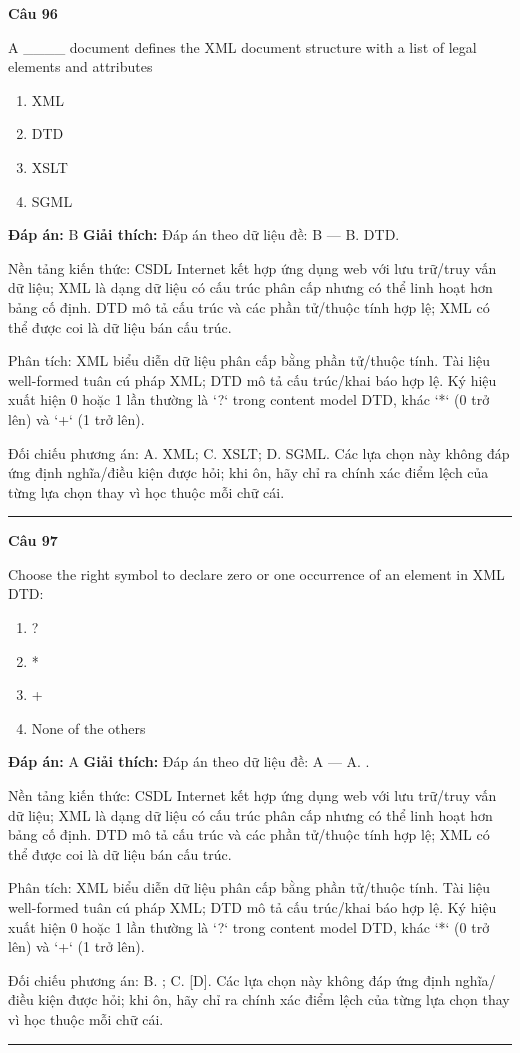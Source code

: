\documentclass[11pt,a4paper]{article}
\newenvironment{question}[1]{%
  \par\vspace{1em}\noindent\textbf{\large Câu #1}\par\vspace{0.4em}
}{%
  \par\vspace{1em}\hrule\vspace{0.6em}
}
\newenvironment{choices}{%
  \begin{enumerate}[label=\textbf{\Alph*.},leftmargin=2.2em,itemsep=2pt,topsep=3pt]
}{%
  \end{enumerate}
}
\newcommand{\choice}{\item}
\begin{document}
\begin{question}{96}
A ____ document defines the XML document structure with a list of legal elements and attributes
\begin{choices}
\choice XML
\choice DTD
\choice XSLT
\choice SGML
\end{choices}
\textbf{Đáp án:} B
\textbf{Giải thích:} Đáp án theo dữ liệu đề: B — B. DTD.

Nền tảng kiến thức: CSDL Internet kết hợp ứng dụng web với lưu trữ/truy vấn dữ liệu; XML là dạng dữ liệu có cấu trúc phân cấp nhưng có thể linh hoạt hơn bảng cố định. DTD mô tả cấu trúc và các phần tử/thuộc tính hợp lệ; XML có thể được coi là dữ liệu bán cấu trúc.

Phân tích: XML biểu diễn dữ liệu phân cấp bằng phần tử/thuộc tính. Tài liệu well-formed tuân cú pháp XML; DTD mô tả cấu trúc/khai báo hợp lệ. Ký hiệu xuất hiện 0 hoặc 1 lần thường là `?` trong content model DTD, khác `*` (0 trở lên) và `+` (1 trở lên).

Đối chiếu phương án: A. XML; C. XSLT; D. SGML. Các lựa chọn này không đáp ứng định nghĩa/điều kiện được hỏi; khi ôn, hãy chỉ ra chính xác điểm lệch của từng lựa chọn thay vì học thuộc mỗi chữ cái.
\end{question}

\begin{question}{97}
Choose the right symbol to declare zero or one occurrence of an element in XML DTD:
\begin{choices}
\choice ?
\choice *
\choice +
\choice None of the others
\end{choices}
\textbf{Đáp án:} A
\textbf{Giải thích:} Đáp án theo dữ liệu đề: A — A. .

Nền tảng kiến thức: CSDL Internet kết hợp ứng dụng web với lưu trữ/truy vấn dữ liệu; XML là dạng dữ liệu có cấu trúc phân cấp nhưng có thể linh hoạt hơn bảng cố định. DTD mô tả cấu trúc và các phần tử/thuộc tính hợp lệ; XML có thể được coi là dữ liệu bán cấu trúc.

Phân tích: XML biểu diễn dữ liệu phân cấp bằng phần tử/thuộc tính. Tài liệu well-formed tuân cú pháp XML; DTD mô tả cấu trúc/khai báo hợp lệ. Ký hiệu xuất hiện 0 hoặc 1 lần thường là `?` trong content model DTD, khác `*` (0 trở lên) và `+` (1 trở lên).

Đối chiếu phương án: B. ; C. [D]. Các lựa chọn này không đáp ứng định nghĩa/điều kiện được hỏi; khi ôn, hãy chỉ ra chính xác điểm lệch của từng lựa chọn thay vì học thuộc mỗi chữ cái.
\end{question}
\end{document}
